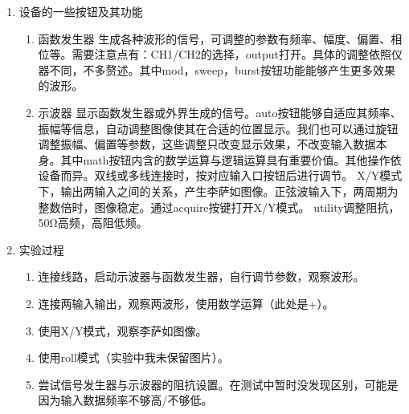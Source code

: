 \documentclass[11pt]{article}
\begin{document}
\begin{enumerate}
    \item 设备的一些按钮及其功能
    \begin{enumerate}
        \item 函数发生器 \newline \hspace*{2em} 生成各种波形的信号，可调整的参数有频率、幅度、偏置、相位等。需要注意点有：CH1/CH2的选择，output打开。具体的调整依照仪器不同，不多赘述。其中mod，sweep，burst按钮功能能够产生更多效果的波形。
        \item 示波器 \newline \hspace*{2em} 显示函数发生器或外界生成的信号。auto按钮能够自适应其频率、振幅等信息，自动调整图像使其在合适的位置显示。我们也可以通过旋钮调整振幅、偏置等参数，这些调整只改变显示效果，不改变输入数据本身。其中math按钮内含的数学运算与逻辑运算具有重要价值。其他操作依设备而异。双线或多线连接时，按对应输入口按钮后进行调节。
              \newline \hspace*{2em} X/Y模式下，输出两输入之间的关系，产生李萨如图像。正弦波输入下，两周期为整数倍时，图像稳定。通过acquire按键打开X/Y模式。 
              \newline \hspace*{2em} utility调整阻抗，50Ω高频，高阻低频。
    \end{enumerate}
    \item 实验过程
    \begin{enumerate}
        \item 连接线路，启动示波器与函数发生器，自行调节参数，观察波形。
        \item 连接两输入输出，观察两波形，使用数学运算（此处是+）。
        \item 使用X/Y模式，观察李萨如图像。
        \item 使用roll模式（实验中我未保留图片）。
        \item 尝试信号发生器与示波器的阻抗设置。在测试中暂时没发现区别，可能是因为输入数据频率不够高/不够低。
        

\end{enumerate}
\end{enumerate}
\end{document}
